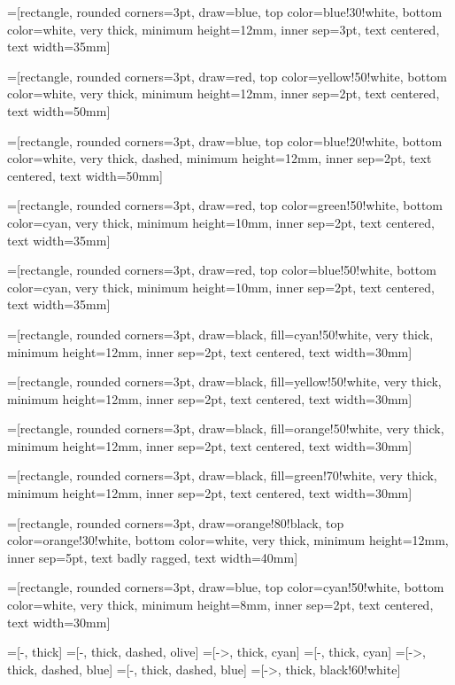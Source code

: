 
%
%

=[rectangle, rounded corners=3pt, draw=blue, top color=blue!30!white, bottom
color=white, very thick, minimum height=12mm, inner sep=3pt, text centered, text width=35mm]

=[rectangle, rounded corners=3pt, draw=red, top color=yellow!50!white, bottom
color=white, very thick, minimum height=12mm, inner sep=2pt, text centered, text width=50mm]

=[rectangle, rounded corners=3pt, draw=blue, top color=blue!20!white, bottom
color=white, very thick, dashed,  minimum height=12mm, inner sep=2pt, text centered, text width=50mm]

=[rectangle, rounded corners=3pt, draw=red, top color=green!50!white, bottom
color=cyan, very thick, minimum height=10mm, inner sep=2pt, text centered, text width=35mm]

=[rectangle, rounded corners=3pt, draw=red, top color=blue!50!white, bottom
color=cyan, very thick, minimum height=10mm, inner sep=2pt, text centered, text width=35mm]

=[rectangle, rounded corners=3pt, draw=black, fill=cyan!50!white,
 very thick, minimum height=12mm, inner sep=2pt,  text centered, text width=30mm]

=[rectangle, rounded corners=3pt, draw=black, fill=yellow!50!white,
 very thick, minimum height=12mm, inner sep=2pt,  text centered, text width=30mm]

=[rectangle, rounded corners=3pt, draw=black, fill=orange!50!white,
 very thick, minimum height=12mm, inner sep=2pt,  text centered, text width=30mm]

=[rectangle, rounded corners=3pt, draw=black, fill=green!70!white,
 very thick, minimum height=12mm, inner sep=2pt,  text centered, text width=30mm]

=[rectangle, rounded corners=3pt, draw=orange!80!black, top color=orange!30!white,
bottom color=white, very thick, minimum height=12mm, inner sep=5pt, text badly ragged, text width=40mm]

=[rectangle, rounded corners=3pt, draw=blue, top color=cyan!50!white, bottom
color=white, very thick, minimum height=8mm, inner sep=2pt, text centered, text width=30mm]

=[-, thick]
=[-, thick, dashed, olive]
=[->, thick, cyan]
=[-, thick, cyan]
=[->, thick, dashed, blue]
=[-, thick, dashed, blue]
=[->, thick,  black!60!white]


